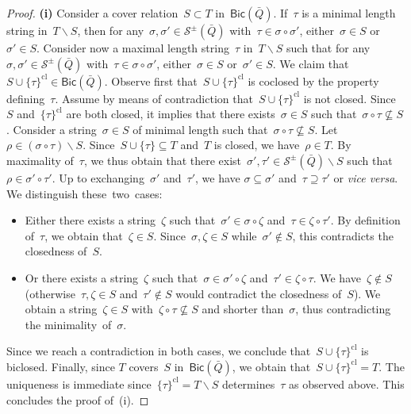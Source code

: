 \documentclass{memo-l}
\theoremstyle{definition}
\newcommand{\ssm}{\smallsetminus} %
\newcommand{\viceversa}{\textit{vice versa}} %
\newcommand{\strings}{\mathcal{S}} %
\newcommand{\closure}[1]{#1^{\mathrm{cl}}} %
\newcommand{\Bicl}[1]{\mathsf{Bic}(#1)} %
\begin{document}
\begin{proof}
\medskip\noindent
{\bf (i)}
Consider a cover relation~$S \subset T$ in~$\Bicl{\bar Q}$.
If~$\tau$ is a minimal length string in~$T \ssm S$, then for any~$\sigma, \sigma' \in \strings^\pm(\bar Q)$ with~$\tau \in \sigma \circ \sigma'$, either~$\sigma \in S$ or~$\sigma' \in S$.
Consider now a maximal length string~$\tau$ in~$T \ssm S$ such that for any~$\sigma, \sigma' \in \strings^\pm(\bar Q)$ with~$\tau \in \sigma \circ \sigma'$, either~$\sigma \in S$ or~$\sigma' \in S$.
We claim that~$S \cup \closure{\{\tau\}} \in \Bicl{\bar Q}$.
Observe first that~$S \cup \closure{\{\tau\}}$ is coclosed by the property defining~$\tau$.
Assume by means of contradiction that~$S \cup \closure{\{\tau\}}$ is not closed.
Since~$S$ and~$\closure{\{\tau\}}$ are both closed, it implies that there exists~$\sigma \in S$ such that~$\sigma \circ \tau \not\subseteq S$.
Consider a string~$\sigma \in S$ of minimal length such that~$\sigma \circ \tau \not\subseteq S$.
Let~$\rho \in (\sigma \circ \tau) \ssm S$.
Since~$S \cup \{\tau\} \subseteq T$ and~$T$ is closed, we have~$\rho \in T$.
By maximality of~$\tau$, we thus obtain that there exist~$\sigma', \tau' \in \strings^\pm(\bar Q) \ssm S$ such that~$\rho \in \sigma' \circ \tau'$.
Up to exchanging~$\sigma'$ and~$\tau'$, we have $\sigma \subseteq \sigma'$ and~$\tau \supseteq \tau'$ or \viceversa.
We distinguish these~two~cases:
\begin{itemize}
\item Either there exists a string~$\zeta$ such that~$\sigma' \in \sigma \circ \zeta$ and~$\tau \in \zeta \circ \tau'$. By definition of~$\tau$, we obtain that~$\zeta \in S$. Since~$\sigma, \zeta \in S$ while~$\sigma' \notin S$, this contradicts the closedness of~$S$.
\item Or there exists a string~$\zeta$ such that~$\sigma \in \sigma' \circ \zeta$ and~$\tau' \in \zeta \circ \tau$. We have~$\zeta \notin S$ (otherwise~${\tau, \zeta \in S}$ and~$\tau' \notin S$ would contradict the closedness of~$S$). We obtain a string~$\zeta \in S$ with~$\zeta \circ \tau \not\subseteq S$ and shorter than~$\sigma$, thus contradicting the minimality~of~$\sigma$.
\end{itemize}
Since we reach a contradiction in both cases, we conclude that~$S \cup \closure{\{\tau\}}$ is biclosed.
Finally, since $T$ covers~$S$ in~$\Bicl{\bar Q}$, we obtain that~$S \cup \closure{\{\tau\}} = T$.
The uniqueness is immediate since~$\closure{\{\tau\}} = T \ssm S$ determines~$\tau$ as observed above.
This concludes the proof of~(i).


\end{proof}
\end{document}
